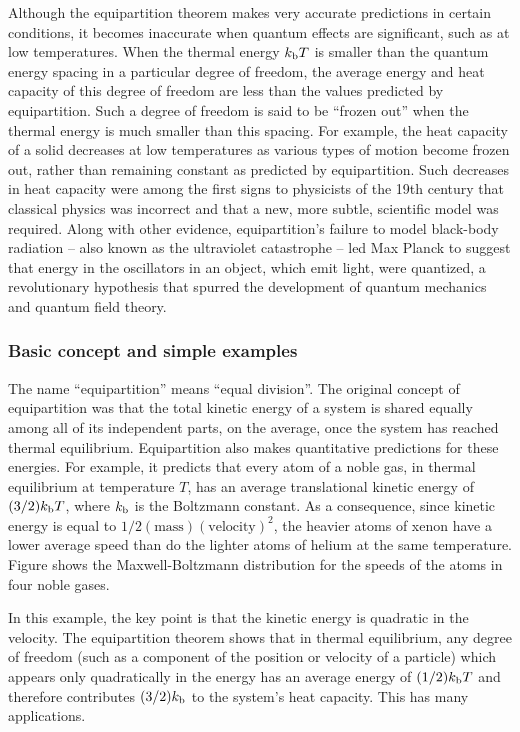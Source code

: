 Although the equipartition theorem makes very accurate predictions in certain conditions, it becomes inaccurate when quantum effects are significant, such as at low temperatures. When the thermal energy $k_\text{b} T$ is smaller than the quantum energy spacing in a particular degree of freedom, the average energy and heat capacity of this degree of freedom are less than the values predicted by equipartition. Such a degree of freedom is said to be ``frozen out'' when the thermal energy is much smaller than this spacing. For example, the heat capacity of a solid decreases at low temperatures as various types of motion become frozen out, rather than remaining constant as predicted by equipartition. Such decreases in heat capacity were among the first signs to physicists of the 19th century that classical physics was incorrect and that a new, more subtle, scientific model was required. Along with other evidence, equipartition's failure to model black-body radiation -- also known as the ultraviolet catastrophe -- led Max Planck to suggest that energy in the oscillators in an object, which emit light, were quantized, a revolutionary hypothesis that spurred the development of quantum mechanics and quantum field theory.


\subsubsection{Basic concept and simple examples}
The name ``equipartition'' means ``equal division''. The original concept of equipartition was that the total kinetic energy of a system is shared equally among all of its independent parts, on the average, once the system has reached thermal equilibrium. Equipartition also makes quantitative predictions for these energies. For example, it predicts that every atom of a noble gas, in thermal equilibrium at temperature $T$, has an average translational kinetic energy of $(3/2)k_\text{b} T$, where $k_\text{b}$ is the Boltzmann constant. As a consequence, since kinetic energy is equal to $1/2(\text{mass})(\text{velocity})^2$, the heavier atoms of xenon have a lower average speed than do the lighter atoms of helium at the same temperature. Figure shows the Maxwell-Boltzmann distribution for the speeds of the atoms in four noble gases.

In this example, the key point is that the kinetic energy is quadratic in the velocity. The equipartition theorem shows that in thermal equilibrium, any degree of freedom (such as a component of the position or velocity of a particle) which appears only quadratically in the energy has an average energy of $(1/2)k_\text{b} T$ and therefore contributes $(3/2)k_\text{b}$ to the system's heat capacity. This has many applications.


